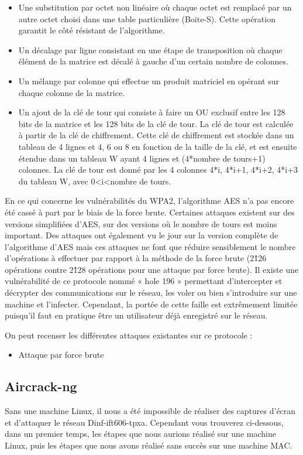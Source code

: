 \documentclass[11pt]{article}
\begin{document}
\begin{itemize}
\item 	Une substitution par octet non linéaire où chaque octet est remplacé par un autre octet choisi dans une table particulière (Boite-S). Cette opération garantit le côté résistant de l’algorithme.
\item 	Un décalage par ligne consistant en une étape de transposition où chaque élément de la matrice est décalé à gauche d’un certain nombre de colonnes.
\item 	Un mélange par colonne qui effectue un produit matriciel en opérant sur chaque colonne de la matrice.
\item  Un ajout de la clé de tour qui consiste à faire un OU exclusif entre les 128 bits de la matrice et les 128 bits de la clé de tour. La clé de tour est calculée à partir de la clé de chiffrement. Cette clé de chiffrement est stockée dans un tableau de 4 lignes et 4, 6 ou 8 en fonction de la taille de la clé, et est ensuite étendue dans un tableau W ayant 4 lignes et (4*nombre de tours+1) colonnes. La clé de tour est donné par les 4 colonnes 4*i, 4*i+1, 4*i+2, 4*i+3 du tableau W, avec 0<i<nombre de tours.
\end{itemize}

En ce qui concerne les vulnérabilités du WPA2, l’algorithme AES n’a pas encore été cassé à part par le biais de la force brute.
Certaines attaques existent sur des versions simplifiées d’AES, sur des versions où le nombre de tours est moins important.
Des attaques ont également vu le jour sur la version complète de l’algorithme d’AES mais ces attaques ne font que réduire sensiblement le nombre d’opérations à effectuer par rapport à la méthode de la force brute (2\^{126} opérations contre 2\^{128} opérations pour une attaque par force brute).
Il existe une vulnérabilité de ce protocole nommé « hole 196 » permettant d’intercepter et décrypter des communications sur le réseau, les voler ou bien s’introduire sur une machine et l’infecter. Cependant, la portée de cette faille est extrêmement limitée puisqu’il faut en pratique être un utilisateur déjà enregistré sur le réseau.

On peut recenser les différentes attaques existantes sur ce protocole :

\begin{itemize}
\item 	Attaque par force brute
\end{itemize}


\subsection{Aircrack-ng}
Sans une machine Linux, il nous a été impossible de réaliser des captures d'écran et d'attaquer le réseau Dinf-ift606-tpxa. Cependant vous trouverez ci-dessous, dans un premier temps, les étapes que nous aurions réalisé sur une machine Linux, puis les étapes que nous avons réalisé sans succès sur une machine MAC. 
\end{document}
